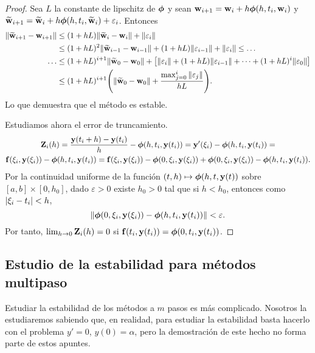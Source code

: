 \begin{proof}
    Sea $L$ la constante de lipschitz de $\vb*{\phi}{}$ y
    sean $\vb{w}{}_{i+1} = \vb{w}{}_i + h\vb*{\phi}{}(h, t_i, \vb{w}{}_i)$ y
    $\vb{\widetilde{w}}{}_{i+1} = \vb{\widetilde{w}}{}_i + h\vb*{\phi}{}(h, t_i, \vb{\widetilde{w}}{}_i) + \varepsilon_i$.
    Entonces
    \begin{align*}
        \norm{\vb{\widetilde{w}}{}_{i+1} - \vb{w}{}_{i+1}} & {} \le
            (1 + hL)\norm{\vb{\widetilde{w}}{}_i - \vb{w}{}_i} + \norm{\varepsilon_i} \\
        & \le (1 + hL)^2\norm{\vb{\widetilde{w}}{}_{i-1} - \vb{w}{}_{i-1}}
            + (1 + hL)\norm{\varepsilon_{i-1}} + \norm{\varepsilon_i} \le \ldots \\
        \ldots & \le (1 + hL)^{i+1}\norm{\vb{\widetilde{w}}{}_0 - \vb{w}{}_0} + \qty[
            \norm{\varepsilon_i} + (1 + hL)\norm{\varepsilon_{i-1}} + \dots
            + (1 + hL)^i\norm{\varepsilon_0}
        ] \\
        & \le (1 + hL)^{i+1}\qty(
            \norm{\vb{\widetilde{w}}{}_0 - \vb{w}{}_0} + \frac{\max_{j=0}^i \norm{\varepsilon_j}}{hL}
        ).
    \end{align*}
    Lo que demuestra que el método es estable.

    Estudiamos ahora el error de truncamiento.
    \begin{multline*}
        \vb{Z}{}_i(h) = \frac{\vb{y}{}(t_i + h) - \vb{y}{}(t_i)}{h} - \vb*{\phi}{}(h, t_i, \vb{y}{}(t_i)) =
        \vb{y}{}'(\xi_i) - \vb*{\phi}{}(h, t_i, \vb{y}{}(t_i)) = \\
        \vb{f}{}(\xi_i, \vb{y}{}(\xi_i)) - \vb*{\phi}{}(h, t_i, \vb{y}{}(t_i)) =
        \vb{f}{}(\xi_i, \vb{y}{}(\xi_i)) - \vb*{\phi}{}(0, \xi_i, \vb{y}{}(\xi_i))
            + \vb*{\phi}{}(0, \xi_i, \vb{y}{}(\xi_i)) - \vb*{\phi}{}(h, t_i, \vb{y}{}(t_i)).
    \end{multline*}
    Por la continuidad uniforme de la función
    $(t, h) \mapsto \vb*{\phi}{}(h, t, \vb{y}{}(t))$
    sobre $[a, b] \times [0, h_0]$,
    dado $\varepsilon > 0$ existe $h_0 > 0$ tal que si $h < h_0$,
    entonces como $\abs{\xi_i - t_i} < h$,
    \begin{equation*}
        \norm{\vb*{\phi}{}(0, \xi_i, \vb{y}{}(\xi_i)) - \vb*{\phi}{}(h, t_i, \vb{y}{}(t_i))} <
        \varepsilon.
    \end{equation*}
    Por tanto, $\lim_{h \to 0} \vb{Z}{}_i(h) = 0$
    si $\vb{f}{}(t_i, \vb{y}{}(t_i)) = \vb*{\phi}{}(0, t_i, \vb{y}{}(t_i))$.
\end{proof}

\subsection{Estudio de la estabilidad para métodos multipaso}

Estudiar la estabilidad de los métodos a $m$ pasos es más complicado.
Nosotros la estudiaremos sabiendo que, en realidad,
para estudiar la estabilidad basta hacerlo con el problema
$y' = 0$, $y(0) = \alpha$,
pero la demostración de este hecho no forma parte de estos apuntes.

